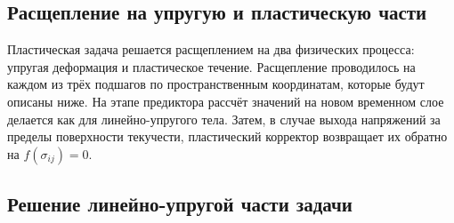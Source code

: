 \subsection{Расщепление на упругую и пластическую части}
Пластическая задача решается расщеплением на два физических процесса: упругая деформация и пластическое течение. Расщепление проводилось на каждом из трёх подшагов по пространственным координатам, которые будут описаны ниже. На этапе предиктора рассчёт значений на новом временном слое делается как для линейно-упругого тела. Затем, в случае выхода напряжений за пределы поверхности текучести, пластический корректор возвращает их обратно на $f(\sigma_{ij})=0$.
\subsection{Решение линейно-упругой части задачи}
